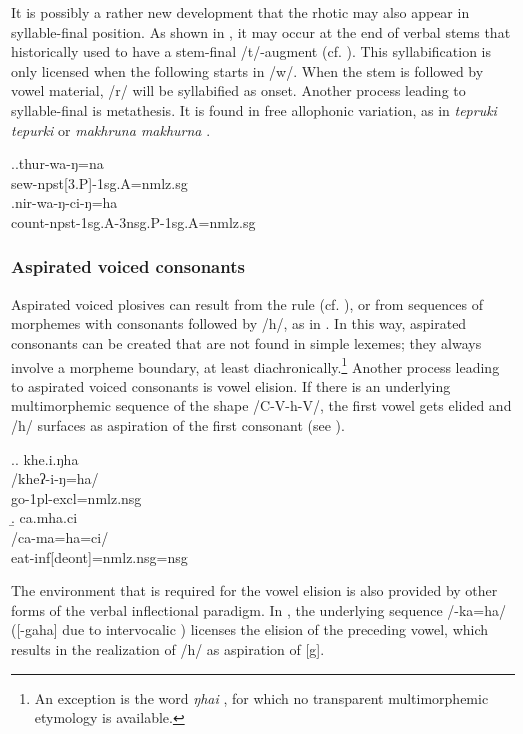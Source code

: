It is possibly a rather new development that the rhotic may also appear in syllable-final position. As shown in  \Next, it may occur at the end of verbal stems that historically used to have a stem-final /t/-augment (cf. ). This syllabification is only licensed when the following  starts in /w/. When the stem is followed by vowel material, /r/ will be syllabified as onset. Another process leading to syllable-final  is metathesis. It is found in free allophonic variation, as in \emph{tepruki \ti tepurki}  or \emph{makhruna \ti makhurna} . 


\ex.\ag.thur-wa-ŋ=na\\
sew{\sc -npst[3.P]-1sg.A=nmlz.sg}\\
\bg.nir-wa-ŋ-ci-ŋ=ha\\
count{\sc -npst-1sg.A-3nsg.P-1sg.A=nmlz.sg}\\


 
\subsubsection{Aspirated voiced consonants}\label{asp-voiced}

Aspirated voiced plosives can result from the  rule (cf. ), or from sequences of morphemes with consonants followed by /h/, as in \Next[a]. In this way, aspirated consonants can be created that are not found in simple lexemes; they always involve a morpheme boundary, at least diachronically.\footnote{An exception is the word \emph{ŋhai} , for which no transparent multimorphemic etymology is available.} Another process leading to aspirated voiced consonants is vowel elision. If there is an underlying multimorphemic sequence of the shape /C-V-h-V/, the first vowel gets elided and /h/ surfaces as aspiration of the first consonant (see \Next[b]). 


\ex.\a. \glll khe.i.ŋha\\
/kheʔ-i-ŋ=ha/\\
go{\sc [pst]-1pl-excl=nmlz.nsg}\\
\b. \glll ca.mha.ci\\
/ca-ma=ha=ci/\\
eat{\sc -inf[deont]=nmlz.nsg=nsg}\\


The environment that is required for the vowel elision is also provided by other forms of the verbal inflectional paradigm. In \Next, the underlying sequence /-ka=ha/ ([-gaha] due to intervocalic ) licenses the elision of the preceding vowel, which results in the realization of /h/ as aspiration of [g].

